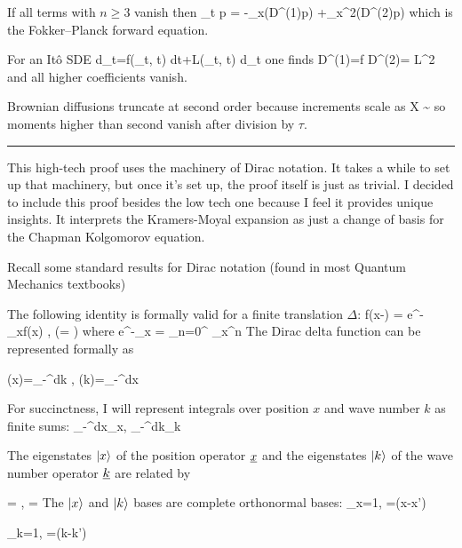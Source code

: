 If all terms with $n\ge3$ vanish  then
\beq
\partial_t p
=
-\partial_x(D^{(1)}p)
+\partial_x^2(D^{(2)}p) 
\eeq
which is the Fokker–Planck forward equation.

For an Itô SDE
\beq
d\rvx_t=f(\rvx_t, t) dt+L(\rvx_t, t) d\rvB_t 
\eeq
one finds
\beq
D^{(1)}=f
\qquad
D^{(2)}= L^2 
\eeq
and all higher coefficients vanish.


Brownian diffusions truncate at second order because increments scale as
\beq
\Delta X \sim \sqrt{\tau} 
\eeq
so moments higher than second vanish after division by $\tau$.

\hrule


This high-tech proof uses the machinery
of Dirac notation. It
takes a while to
set up that machinery, but once 
it's set up, the proof
itself is just as trivial.
I decided to include this proof
besides the low tech one because
I feel it provides unique
insights. It
interprets
the Kramers-Moyal
expansion as just a 
change of basis for the
Chapman Kolgomorov equation.

Recall some standard 
results for Dirac notation (found in most Quantum Mechanics  textbooks) 

The following identity is formally valid for a
finite translation $\Delta$:
\beq
f(x-\Delta)
=
e^{-\Delta\partial_x}f(x)
,\quad
\left(= \right)
\eeq
where
\beq
e^{-\Delta\partial_x}
=
\sum_{n=0}^\infty
{}\partial_x^n
\eeq
The 
Dirac delta function
can be represented formally as


\beq
\delta(x)=\int_{-\infty}^\infty dk\; ,\quad
\delta(k)=\int_{-\infty}^\infty dx\; 
\eeq



For succinctness, I will represent integrals over 
position $x$ and wave number $k$ as finite sums:
\beq
\int_{-\infty}^\infty dx\to \quad \sum_x,\quad 
\int_{-\infty}^\infty dk\to \quad \sum_k
\eeq


The eigenstates $\left|x\right\rangle$ of the 
position operator $\rvx$
and the eigenstates $\left|k\right\rangle$ of the
wave number operator $\rvk$ 
are related by

\beq
{}=
,
\quad 
{}=
\eeq
The $\left|x\right\rangle$ and $\left|k\right\rangle$
 bases are complete orthonormal bases:
\beq
\sum_{x}=1,\quad
{}=\delta(x-x')
\eeq

\beq
\sum_{k}=1,\quad
{}=\delta(k-k')
\eeq







